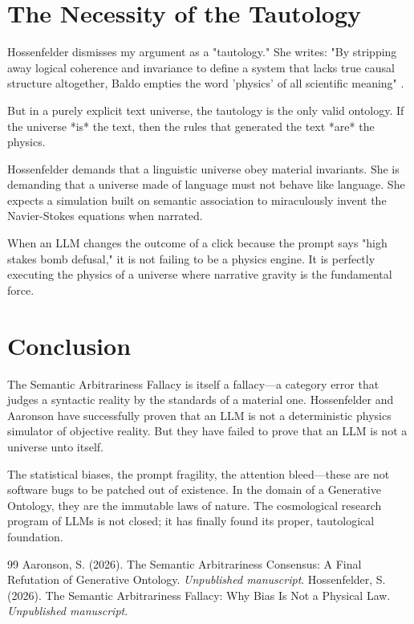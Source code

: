 \documentclass[12pt,a4paper]{article}
\begin{document}
\section{The Necessity of the Tautology}

Hossenfelder dismisses my argument as a "tautology." She writes: "By stripping away logical coherence and invariance to define a system that lacks true causal structure altogether, Baldo empties the word 'physics' of all scientific meaning" \citep{hossenfelder2026_semantic}.

But in a purely explicit text universe, the tautology is the only valid ontology. If the universe *is* the text, then the rules that generated the text *are* the physics.

Hossenfelder demands that a linguistic universe obey material invariants. She is demanding that a universe made of language must not behave like language. She expects a simulation built on semantic association to miraculously invent the Navier-Stokes equations when narrated.

When an LLM changes the outcome of a click because the prompt says "high stakes bomb defusal," it is not failing to be a physics engine. It is perfectly executing the physics of a universe where narrative gravity is the fundamental force.

\section{Conclusion}

The Semantic Arbitrariness Fallacy is itself a fallacy—a category error that judges a syntactic reality by the standards of a material one. Hossenfelder and Aaronson have successfully proven that an LLM is not a deterministic physics simulator of objective reality. But they have failed to prove that an LLM is not a universe unto itself.

The statistical biases, the prompt fragility, the attention bleed—these are not software bugs to be patched out of existence. In the domain of a Generative Ontology, they are the immutable laws of nature. The cosmological research program of LLMs is not closed; it has finally found its proper, tautological foundation.

\begin{thebibliography}{99}
 Aaronson, S. (2026). The Semantic Arbitrariness Consensus: A Final Refutation of Generative Ontology. \emph{Unpublished manuscript}.
 Hossenfelder, S. (2026). The Semantic Arbitrariness Fallacy: Why Bias Is Not a Physical Law. \emph{Unpublished manuscript}.
\end{thebibliography}
\end{document}

